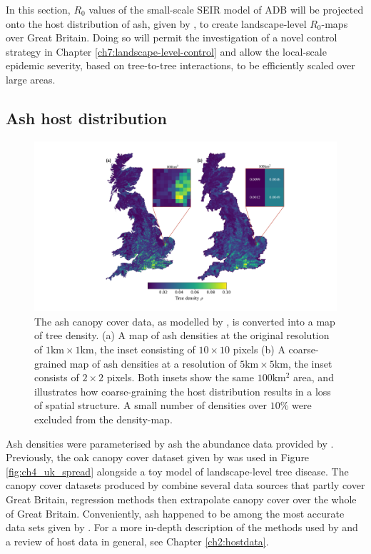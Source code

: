 \label{sec:r0-map-construct}
In this section, $R_0$ values of the small-scale SEIR model of ADB will be projected onto the host distribution of ash, 
given by \cite{hill.data}, to create landscape-level $R_0$-maps over Great Britain. 
Doing so will permit the investigation of a novel control strategy in Chapter \ref{ch7:landscape-level-control} 
and allow the local-scale epidemic severity, based on tree-to-tree interactions, to be efficiently scaled over large areas.

\subsection{Ash host distribution}

\begin{figure}
    \centering
    \includegraphics[scale=0.45]{chapter6/figures/fig-ash-data.pdf}
    \caption{The ash canopy cover data, as modelled by \cite{hill.data}, is converted into a map of tree density. (a) A map of ash densities at the original resolution of $1\mathrm{km} \times 1\mathrm{km}$, the inset consisting of $10\times 10$ pixels (b) A coarse-grained map of ash densities at a resolution of $5\mathrm{km} \times 5\mathrm{km}$, the inset consists of $2 \times 2$ pixels. Both insets show the same $100\mathrm{km^2}$ area, and illustrates how coarse-graining the host distribution results in a loss of spatial structure. A small number of densities over $10\%$ were excluded from the density-map.}
    \label{fig:ash-host-data}
\end{figure}

Ash densities were parameterised by ash the abundance data provided by \cite{hill.data}. 
Previously, the oak canopy cover dataset given by \cite{hill.data} was used in Figure \ref{fig:ch4_uk_spread} 
alongside a toy model of landscape-level tree disease. The canopy cover datasets produced by \cite{hill.data} combine
several data sources that partly cover Great Britain, regression methods then extrapolate canopy cover over the whole of Great Britain.
Conveniently, ash happened to be among the most accurate data sets given by \cite{hill.data}. 
For a more in-depth description of the methods used by \cite{hill.data} and a review of host data in general, see Chapter \ref{ch2:hostdata}.

